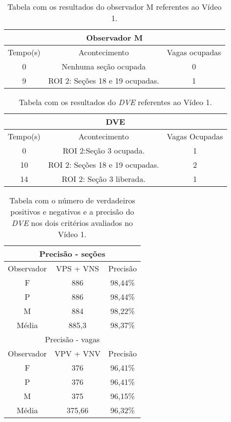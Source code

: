 \begin{table}[H]
\begin{center}
\begin{tabular}{|c||c||c|}
\hline
\multicolumn{3}{|c|}{Observador M}  \\ \hline \hline
Tempo(s) & Acontecimento & Vagas ocupadas\\ \hline
0 & Nenhuma seção ocupada & 0 \\ \hline
9 & ROI 2: Seções 18 e 19 ocupadas. & 1 \\
\hline
\end{tabular}
\caption{Tabela com os resultados do observador M referentes ao Vídeo 1.}
\label{tab:video1M}
\end{center}
\end{table}

\begin{table}[H]
\begin{center}
\begin{tabular}{|c||c||c|}
\hline
\multicolumn{3}{|c|}{DVE}  \\ \hline \hline
Tempo(s) & Acontecimento & Vagas Ocupadas\\ \hline
0 & ROI 2:Seção 3 ocupada. & 1 \\ \hline
10 & ROI 2: Seções 18 e 19 ocupadas. & 2\\ \hline
14 & ROI 2: Seção 3 liberada. & 1\\
\hline
\end{tabular}
\caption{Tabela com os resultados do \textit{DVE} referentes ao Vídeo 1.}
\label{tab:video1P}
\end{center}
\end{table}

\begin{table}[H]
\begin{center}
\begin{tabular}{|c||c||c|}
\hline
\multicolumn{3}{|c|}{Precisão - seções}  \\ \hline \hline
Observador & VPS + VNS & Precisão \\ \hline
F & 886 & 98,44\% \\  \hline
P & 886 & 98,44\% \\ \hline
M & 884 & 98,22\% \\ \hline
Média & 885,3 & 98,37\% \\
\hline
\hline
\multicolumn{3}{|c|}{Precisão - vagas}  \\ \hline \hline
Observador & VPV + VNV & Precisão \\ \hline
F & 376 & 96,41\% \\  \hline
P & 376 & 96,41\% \\ \hline
M & 375 & 96,15\% \\ \hline
Média & 375,66 & 96,32\% \\
\hline
\end{tabular}
\caption{Tabela com o número de verdadeiros positivos e negativos e a precisão do \textit{DVE} nos dois critérios avaliados no Vídeo 1.}
\label{tab:rvideo1}
\end{center}
\end{table}


